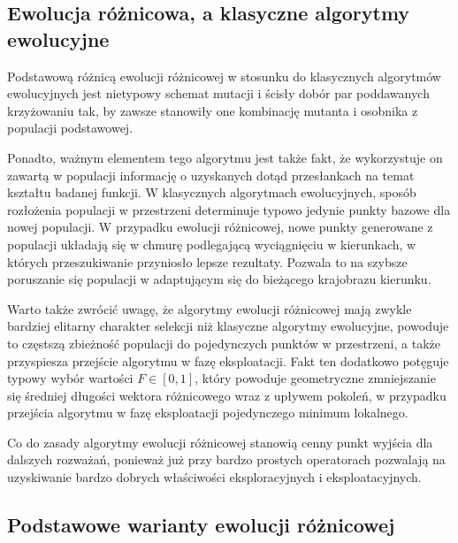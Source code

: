 \documentclass[12pt,a4paper]{report}
\begin{document}
{{\subsection{Ewolucja różnicowa, a klasyczne algorytmy ewolucyjne}
\par{
Podstawową różnicą ewolucji różnicowej w stosunku do klasycznych algorytmów ewolucyjnych jest nietypowy schemat mutacji i ścisły dobór par poddawanych krzyżowaniu tak, by zawsze stanowiły one kombinację mutanta i osobnika z populacji  podstawowej.
}
\par{
Ponadto, ważnym elementem tego algorytmu jest także fakt, że wykorzystuje on zawartą w populacji informację o uzyskanych dotąd przesłankach na temat kształtu badanej funkcji. W klasycznych algorytmach ewolucyjnych, sposób rozłożenia populacji w przestrzeni determinuje typowo jedynie punkty bazowe dla nowej populacji. W przypadku ewolucji różnicowej, nowe punkty generowane z populacji układają się w chmurę podlegającą wyciągnięciu w kierunkach, w których przeszukiwanie przyniosło lepsze rezultaty. Pozwala to na szybsze poruszanie się populacji w adaptującym się do bieżącego krajobrazu kierunku.
}
\par{
Warto także zwrócić uwagę, że algorytmy ewolucji różnicowej mają zwykle bardziej elitarny charakter selekcji niż klasyczne algorytmy ewolucyjne, powoduje to częstszą zbieżność populacji do pojedynczych punktów w przestrzeni, a także przyspiesza przejście algorytmu w fazę eksploatacji. Fakt ten dodatkowo potęguje typowy wybór wartości $F \in [0, 1]$, który powoduje geometryczne zmniejszanie się średniej długości wektora różnicowego wraz z upływem pokoleń, w przypadku przejścia algorytmu w fazę eksploatacji pojedynczego minimum lokalnego.
}
\par{
Co do zasady algorytmy ewolucji różnicowej stanowią cenny punkt wyjścia dla dalszych rozważań, ponieważ już przy bardzo prostych operatorach pozwalają na uzyskiwanie bardzo dobrych właściwości eksploracyjnych i eksploatacyjnych.
}

\subsection{Podstawowe warianty ewolucji różnicowej}
}}
\end{document}
